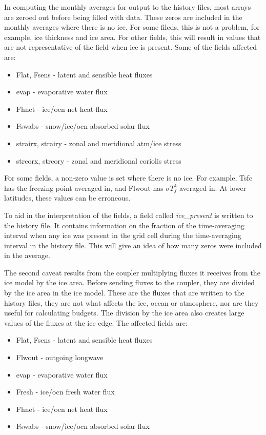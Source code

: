 In computing the monthly averages for output to the history files,
most arrays are zeroed out before being filled with data. These
zeros are included in the monthly averages where there is no ice.
For some fileds, this is not a problem, for example, ice thickness
and ice area.  For other fields, this will result in values that
are not representative of the field when ice is present.
Some of the fields affected are:

\begin{itemize}
\item Flat, Fsens - latent and sensible heat fluxes
\item evap - evaporative water flux
\item Fhnet - ice/ocn net heat flux
\item Fswabs - snow/ice/ocn absorbed solar flux
\item strairx, strairy - zonal and meridional atm/ice stress
\item strcorx, strcory - zonal and meridional coriolis stress
\end{itemize}

For some fields, a non-zero value is set where there is no ice.
For example, Tsfc has the freezing point averaged in, and Flwout
has $\sigma T_f^4$ averaged in.  At lower latitudes, these values
can be erroneous. 

To aid in the interpretation of the fields, a field called 
{\it ice\_present} is written to the history file.  It contains
information on the fraction of the time-averaging interval when any
ice was present in the grid cell during the time-averaging interval
in the history file.  This will give an idea of how many
zeros were included in the average.

The second caveat results from the coupler multiplying fluxes it receives
from the ice model by the ice area.  Before sending fluxes to the coupler,
they are divided by the ice area in the ice model.  These are the fluxes
that are written to the history files, they are not what affects the ice,
ocean or atmosphere, nor are they useful for calculating budgets.  The
division by the ice area also creates large values of the fluxes at the
ice edge. The affected fields are:

\begin{itemize}
\item Flat, Fsens - latent and sensible heat fluxes
\item Flwout - outgoing longwave
\item evap - evaporative water flux
\item Fresh - ice/ocn fresh water flux
\item Fhnet - ice/ocn net heat flux
\item Fswabs - snow/ice/ocn absorbed solar flux
\end{itemize}

